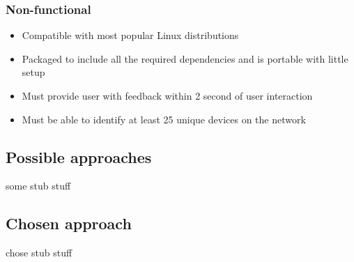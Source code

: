 	\subsubsection{Non-functional}
	\begin{itemize}
		\item Compatible with most popular Linux distributions
		\item Packaged to include all the required dependencies and is portable with little setup
		\item Must provide user with feedback within 2 second of user interaction
		\item Must be able to identify at least 25 unique devices on the network
	\end{itemize}


\subsection{Possible approaches}
	some stub stuff

\subsection{Chosen approach}
	chose stub stuff
